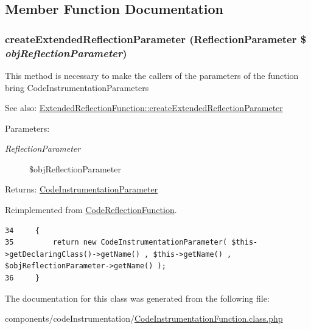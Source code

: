 \subsection{Member Function Documentation}
\hypertarget{class_code_instrumentation_function_98ceb248f2b535a3a83ac2e7990e0c1f}{
\subsubsection[{createExtendedReflectionParameter}]{\setlength{\rightskip}{0pt plus 5cm}createExtendedReflectionParameter (ReflectionParameter \$ {\em objReflectionParameter})}}
\label{class_code_instrumentation_function_98ceb248f2b535a3a83ac2e7990e0c1f}


This method is necessary to make the callers of the parameters of the function bring CodeInstrumentationParameters

\begin{Desc}
\item[See also:]\hyperlink{class_extended_reflection_function_98ceb248f2b535a3a83ac2e7990e0c1f}{ExtendedReflectionFunction::createExtendedReflectionParameter} \end{Desc}
\begin{Desc}
\item[Parameters:]
\begin{description}
\item[{\em ReflectionParameter}]\$objReflectionParameter \end{description}
\end{Desc}
\begin{Desc}
\item[Returns:]\hyperlink{class_code_instrumentation_parameter}{CodeInstrumentationParameter} \end{Desc}


Reimplemented from \hyperlink{class_code_reflection_function_98ceb248f2b535a3a83ac2e7990e0c1f}{CodeReflectionFunction}.

\begin{Code}\begin{verbatim}34     {
35         return new CodeInstrumentationParameter( $this->getDeclaringClass()->getName() , $this->getName() , $objReflectionParameter->getName() );
36     }
\end{verbatim}
\end{Code}




The documentation for this class was generated from the following file:\begin{CompactItemize}
\item 
components/codeInstrumentation/\hyperlink{_code_instrumentation_function_8class_8php}{CodeInstrumentationFunction.class.php}\end{CompactItemize}
